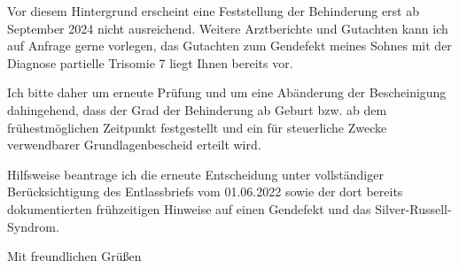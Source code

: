 \documentclass[a4paper,12pt]{dinbrief}
\begin{document}
\begin{letter}
Vor diesem Hintergrund erscheint eine Feststellung der Behinderung erst ab
September 2024 nicht ausreichend. Weitere Arztberichte und Gutachten kann ich
auf Anfrage gerne vorlegen, das Gutachten zum Gendefekt meines Sohnes mit der
Diagnose partielle Trisomie 7 liegt Ihnen bereits vor.  

Ich bitte daher um erneute Prüfung und um eine Abänderung der
Bescheinigung dahingehend, dass der Grad der Behinderung ab Geburt bzw. ab dem
frühestmöglichen Zeitpunkt festgestellt und ein für steuerliche Zwecke
verwendbarer Grundlagenbescheid erteilt wird.  

Hilfsweise beantrage ich die erneute Entscheidung unter vollständiger
Berücksichtigung des Entlassbriefs vom 01.06.2022 sowie der dort bereits
dokumentierten frühzeitigen Hinweise auf einen Gendefekt und das
Silver-Russell-Syndrom.

\closing{Mit freundlichen Grüßen} 
\end{letter}
\end{document}
